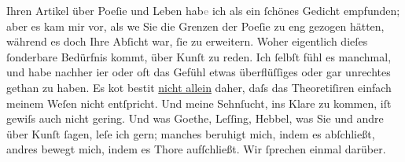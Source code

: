\pstart
           Ihren Artikel über Poeſie und
                  Leben hab\textcolor{gray}{e} ich als ein{ }ſchönes Gedicht empfunden; aber es
               kam mir vor, als we{\geminationn} Sie die Grenzen der Poeſie zu eng
               gezogen hätten, während es doch Ihre Abſicht war,{ }ſie zu erweitern. Woher eigentlich
               dieſes{ }ſonderbare Bedürfnis kommt, über Kunſt zu reden. Ich{ }ſelbſt fühl es manchmal,
               und {\pb}habe nachher i{\geminationm}er oder
               oft das Gefühl etwas überflüſſiges oder gar unrechtes gethan \introOben{}zu\introOben{} haben. Es ko{\geminationm}t besti{\geminationm}t \uline{nicht allein} daher,
               daſs das Theoretiſiren einfach meinem Weſen nicht entſpricht. Und meine Sehnſucht,
               ins Klare zu kommen, iſt gewiſs auch nicht gering. Und was Goethe, Leſſing, Hebbel, was Sie und andre über Kunſt{ }ſagen, leſe
               ich gern; manches beruhigt mich, indem es abſchließt, andres bewegt {\pb}mich, indem es Thore aufſchließt. Wir{ }ſprechen einmal
               darüber.\pend
           
